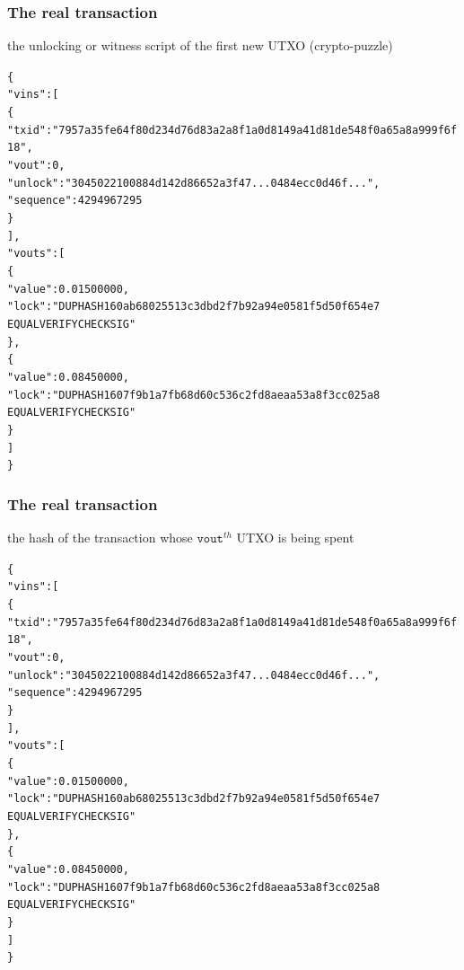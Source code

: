 \documentclass[11pt]{beamer}  %
\begin{document}
\begin{frame}[fragile]\frametitle{The real transaction}

  \begin{center}
    the unlocking or witness script of the first new UTXO (crypto-puzzle)
  \end{center}

  {\scriptsize\begin{alltt}
\{
  "vins": [
    \{
      "txid": "7957a35fe64f80d234d76d83a2a8f1a0d8149a41d81de548f0a65a8a999f6f18",
      "vout": 0,
      "unlock": "3045022100884d142d86652a3f47... 0484ecc0d46f...",
      "sequence": 4294967295
    \}
  ],
  "vouts": [
    \{
      "value": 0.01500000,
      \alert{"lock": "DUP HASH160 ab68025513c3dbd2f7b92a94e0581f5d50f654e7
               EQUALVERIFY CHECKSIG"}
    \},
    \{
      "value": 0.08450000,
      "lock": "DUP HASH160 7f9b1a7fb68d60c536c2fd8aeaa53a8f3cc025a8
               EQUALVERIFY CHECKSIG"
    \}
  ]
\}
\end{alltt}}

\end{frame}

\begin{frame}[fragile]\frametitle{The real transaction}

  \begin{center}
    the hash of the transaction whose $\mathtt{vout}^{\mathit{th}}$ UTXO is being spent
  \end{center}

  {\scriptsize\begin{alltt}
\{
  "vins": [
    \{
      \alert{"txid": "7957a35fe64f80d234d76d83a2a8f1a0d8149a41d81de548f0a65a8a999f6f18",
      "vout": 0},
      "unlock": "3045022100884d142d86652a3f47... 0484ecc0d46f...",
      "sequence": 4294967295
    \}
  ],
  "vouts": [
    \{
      "value": 0.01500000,
      "lock": "DUP HASH160 ab68025513c3dbd2f7b92a94e0581f5d50f654e7
               EQUALVERIFY CHECKSIG"
    \},
    \{
      "value": 0.08450000,
      "lock": "DUP HASH160 7f9b1a7fb68d60c536c2fd8aeaa53a8f3cc025a8
               EQUALVERIFY CHECKSIG"
    \}
  ]
\}
\end{alltt}}

\end{frame}
\end{document}
